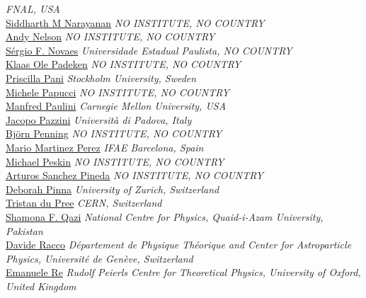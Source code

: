 \emph{FNAL, USA}\\
\noindent\href{mailto:siddharth.m.narayanan@cern.ch}{Siddharth M Narayanan} 
\emph{NO INSTITUTE, NO COUNTRY}\\
\noindent\href{mailto:andrew.james.nelson@cern.ch}{Andy Nelson} 
\emph{NO INSTITUTE, NO COUNTRY}\\
\noindent\href{mailto:Sergio.Novaes@cern.ch}{S\'ergio F. Novaes} 
\emph{Universidade Estadual Paulista, NO COUNTRY}\\
\noindent\href{mailto:klaas.ole.padeken@cern.ch}{Klaas Ole Padeken} 
\emph{NO INSTITUTE, NO COUNTRY}\\
\noindent\href{mailto:Priscilla.Pani@cern.ch}{Priscilla Pani} 
\emph{Stockholm University, Sweden}\\
\noindent\href{mailto:mpapucci@lbl.gov}{Michele Papucci} 
\emph{NO INSTITUTE, NO COUNTRY}\\
\noindent\href{mailto:paulini@heps.phys.cmu.edu}{Manfred Paulini} 
\emph{Carnegie Mellon University, USA}\\
\noindent\href{mailto:Jacopo.Pazzini@pd.infn.it}{Jacopo Pazzini} 
\emph{Universit\`a di Padova, Italy}\\
\noindent\href{mailto:Bjoern.Penning@cern.ch}{Bj\"orn Penning} 
\emph{NO INSTITUTE, NO COUNTRY}\\
\noindent\href{mailto:mmp@ifae.es}{Mario Martinez Perez} 
\emph{IFAE Barcelona, Spain}\\
\noindent\href{mailto:mpeskin@slac.stanford.edu}{Michael Peskin} 
\emph{NO INSTITUTE, NO COUNTRY}\\
\noindent\href{mailto:Arturo.Rodolfo.Sanchez.Pineda@cern.ch}{Arturos Sanchez Pineda} 
\emph{NO INSTITUTE, NO COUNTRY}\\
\noindent\href{mailto:Deborah.Pinna@cern.ch}{Deborah Pinna} 
\emph{University of Zurich, Switzerland}\\
\noindent\href{mailto:tdupree.cms@gmail.com}{Tristan du Pree} 
\emph{CERN, Switzerland}\\
\noindent\href{mailto:shamona.fawad.qazi@cern.ch}{Shamona F. Qazi} 
\emph{National Centre for Physics, Quaid-i-Azam University, Pakistan}\\
\noindent\href{mailto:davide.racco@unige.ch}{Davide Racco} 
\emph{D\'epartement de Physique Th\'eorique and Center for Astroparticle Physics, Universit\'e de Gen\`eve, Switzerland}\\
\noindent\href{mailto:emanuele.re@physics.ox.ac.uk}{Emanuele Re} 
\emph{Rudolf Peierls Centre for Theoretical Physics, University of Oxford, United Kingdom}\\

